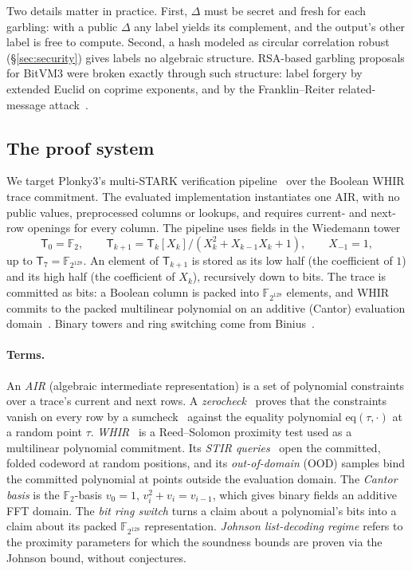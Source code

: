 \documentclass[11pt]{article}
\newcommand{\F}{\mathbb{F}_{2^{128}}}
\newcommand{\T}{\mathsf{T}}
\begin{document}
Two details matter in practice. First, $\Delta$ must be secret and fresh for
each garbling: with a public $\Delta$ any label yields its complement, and the
output's other label is free to compute. Second, a hash modeled as circular correlation
robust (\S\ref{sec:security}) gives labels no algebraic structure. RSA-based garbling proposals for BitVM3 were broken
exactly through such structure: label forgery by extended Euclid on coprime
exponents, and by the Franklin--Reiter related-message
attack~\cite{flb25}.

\subsection{The proof system}

We target Plonky3's multi-STARK verification pipeline~\cite{plonky3} over the
Boolean WHIR trace commitment. The evaluated implementation instantiates one
AIR, with no public values, preprocessed columns or lookups, and requires
current- and next-row openings for every column. The pipeline uses fields in the
Wiedemann tower~\cite{wiedemann88}
\[
  \T_0=\mathbb{F}_2,\qquad \T_{k+1}=\T_k[X_k]/(X_k^2+X_{k-1}X_k+1),\qquad X_{-1}=1 ,
\]
up to $\T_7=\F$. An element of $\T_{k+1}$ is stored as its low half (the
coefficient of $1$) and its high half (the coefficient of $X_k$), recursively
down to bits. The trace is committed as bits: a Boolean column is packed into
$\F$ elements, and WHIR commits to the packed multilinear polynomial on an
additive (Cantor) evaluation domain~\cite{cantor89,lch14}. Binary towers and
ring switching come from Binius~\cite{dp25binius,dp24ringswitch}.

\paragraph{Terms.} An \emph{AIR} (algebraic intermediate representation) is a
set of polynomial constraints over a trace's current and next rows. A
\emph{zerocheck}~\cite{hyperplonk23} proves that the constraints vanish on every
row by a sumcheck~\cite{lfkn92}
against the equality polynomial $\mathrm{eq}(\tau,\cdot)$ at a random point
$\tau$. \emph{WHIR}~\cite{whir25} is a Reed--Solomon proximity test used as a multilinear
polynomial commitment. Its \emph{STIR queries}~\cite{stir24} open the committed, folded
codeword at random positions, and its \emph{out-of-domain} (OOD) samples bind the
committed polynomial at points outside the evaluation domain. The \emph{Cantor
basis} is the $\mathbb{F}_2$-basis $v_0=1$, $v_i^2+v_i=v_{i-1}$, which gives
binary fields an additive FFT domain. The \emph{bit ring switch} turns a claim
about a polynomial's bits into a claim about its packed $\F$ representation.
\emph{Johnson list-decoding regime} refers to the proximity parameters for which
the soundness bounds are proven via the Johnson bound, without conjectures.
\end{document}
